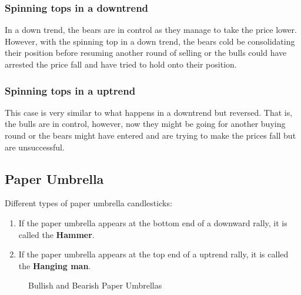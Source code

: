 
\subsubsection{Spinning tops in a downtrend}

In a down trend, the bears are in control as they manage to take the price lower. However, with the spinning top in a down trend, the bears cold be consolidating their position before resuming another round of selling or the bulls could have arrested the price fall and have tried to hold onto their position.

\subsubsection{Spinning tops in a uptrend}

This case is very similar to what happens in a downtrend but reversed. That is, the bulls are in control, however, now they might be going for another buying round or the bears might have entered and are trying to make the prices fall but are unsuccessful.

\newpage

\subsection{Paper Umbrella}


{\large Different types of paper umbrella candlesticks:}
\begin{enumerate}
  \item If the paper umbrella appears at the bottom end of a downward rally, it is called the \textbf{Hammer}.
  \item If the paper umbrella appears at the top end of a uptrend rally, it is called the \textbf{Hanging man}.
\end{enumerate}

\begin{figure}[h]
  \centering

  \caption{Bullish and Bearish Paper Umbrellas}
\end{figure}

